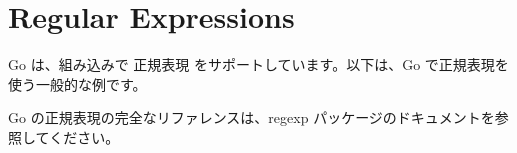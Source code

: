 \section{Regular Expressions}

Go は、組み込みで 正規表現 をサポートしています。以下は、Go で正規表現を使う一般的な例です。




Go の正規表現の完全なリファレンスは、regexp パッケージのドキュメントを参照してください。